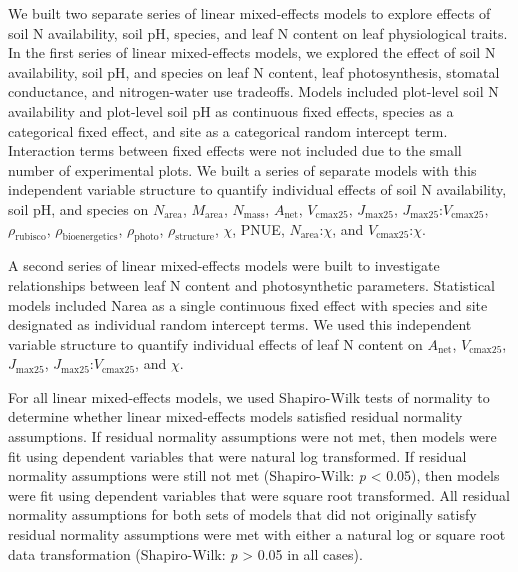     We built two separate series of linear mixed-effects models to explore effects of soil N availability, soil pH, species, and leaf N content on leaf physiological traits. In the first series of linear mixed-effects models, we explored the effect of soil N availability, soil pH, and species on leaf N content, leaf photosynthesis, stomatal conductance, and nitrogen-water use tradeoffs. Models included plot-level soil N availability and plot-level soil pH as continuous fixed effects, species as a categorical fixed effect, and site as a categorical random intercept term. Interaction terms between fixed effects were not included due to the small number of experimental plots. We built a series of separate models with this independent variable structure to quantify individual effects of soil N availability, soil pH, and species on $N_\mathrm{area}$, $M_\mathrm{area}$, $N_\mathrm{mass}$, $A_\mathrm{net}$, $V_\mathrm{cmax25}$, $J_\mathrm{max25}$, $J_\mathrm{max25}$:$V_\mathrm{cmax25}$, $\rho_\mathrm{rubisco}$, $\rho_\mathrm{bioenergetics}$, $\rho_\mathrm{photo}$, $\rho_\mathrm{structure}$, $\chi$, PNUE, $N_{\mathrm{area}}$:$\chi$, and $V_{\mathrm{cmax25}}$:$\chi$.

    A second series of linear mixed-effects models were built to investigate relationships between leaf N content and photosynthetic parameters. Statistical models included Narea as a single continuous fixed effect with species and site designated as individual random intercept terms. We used this independent variable structure to quantify individual effects of leaf N content on $A_\mathrm{net}$, $V_\mathrm{cmax25}$, $J_\mathrm{max25}$, $J_\mathrm{max25}$:$V_\mathrm{cmax25}$, and $\chi$.

    For all linear mixed-effects models, we used Shapiro-Wilk tests of normality to determine whether linear mixed-effects models satisfied residual normality assumptions. If residual normality assumptions were not met, then models were fit using dependent variables that were natural log transformed. If residual normality assumptions were still not met (Shapiro-Wilk: \textit{p} < 0.05), then models were fit using dependent variables that were square root transformed. All residual normality assumptions for both sets of models that did not originally satisfy residual normality assumptions were met with either a natural log or square root data transformation (Shapiro-Wilk: \textit{p} > 0.05 in all cases).

